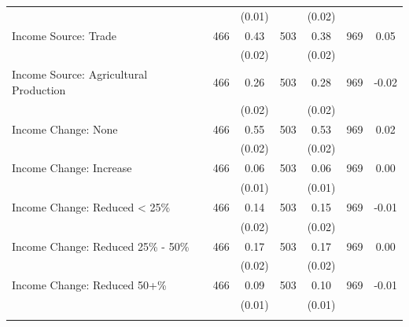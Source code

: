 \begin{tabular}{@{\extracolsep{5pt}}lcccccc}
 &   & (0.01)  &   & (0.02)  &   &  \\ [1ex]
Income Source: Trade   & 466    & 0.43    & 503    & 0.38    & 969    & 0.05   \\
 &   & (0.02)  &   & (0.02)  &   &  \\ [1ex]
Income Source: Agricultural Production   & 466    & 0.26    & 503    & 0.28    & 969    & -0.02   \\
 &   & (0.02)  &   & (0.02)  &   &  \\ [1ex]
Income Change: None   & 466    & 0.55    & 503    & 0.53    & 969    & 0.02   \\
 &   & (0.02)  &   & (0.02)  &   &  \\ [1ex]
Income Change: Increase   & 466    & 0.06    & 503    & 0.06    & 969    & 0.00   \\
 &   & (0.01)  &   & (0.01)  &   &  \\ [1ex]
Income Change: Reduced < 25\%   & 466    & 0.14    & 503    & 0.15    & 969    & -0.01   \\
 &   & (0.02)  &   & (0.02)  &   &  \\ [1ex]
Income Change: Reduced 25\% - 50\%   & 466    & 0.17    & 503    & 0.17    & 969    & 0.00   \\
 &   & (0.02)  &   & (0.02)  &   &  \\ [1ex]
Income Change: Reduced 50+\%   & 466    & 0.09    & 503    & 0.10    & 969    & -0.01   \\
 &   & (0.01)  &   & (0.01)  &   &  \\ [1ex]
\hline \hline \\[-1.8ex]

\end{tabular}
